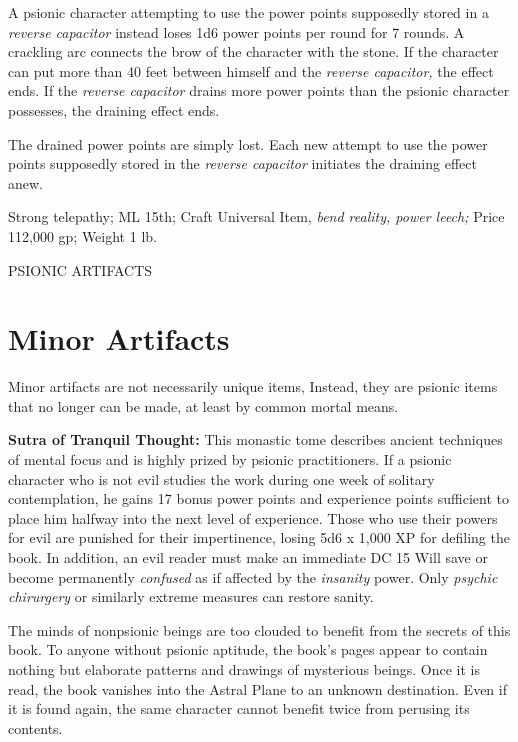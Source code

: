 \documentclass{article}
\begin{document}
A psionic character attempting to use the power points supposedly stored in a \textit{reverse 
capacitor }instead loses 1d6 power points per round for 7 rounds. A crackling arc 
connects the brow of the character with the stone. If the character can put more 
than 40 feet between himself and the \textit{reverse capacitor, }the effect ends. 
If the \textit{reverse capacitor }drains more power points than the psionic character 
possesses, the draining effect ends.

The drained power points are simply lost. Each new attempt to use the power points 
supposedly stored in the \textit{reverse capacitor }initiates the draining effect 
anew.

Strong telepathy; ML 15th; Craft Universal Item, \textit{bend reality, power leech; 
}Price 112,000 gp; Weight 1 lb.

\vspace{12pt}
PSIONIC ARTIFACTS

\section*{\textbf{Minor Artifacts}}

Minor artifacts are not necessarily unique items, Instead, they are psionic items 
that no longer can be made, at least by common mortal means.

\textbf{Sutra of Tranquil Thought:} This monastic tome describes ancient techniques 
of mental focus and is highly prized by psionic practitioners. If a psionic character 
who is not evil studies the work during one week of solitary contemplation, he 
gains 17 bonus power points and experience points sufficient to place him halfway 
into the next level of experience. Those who use their powers for evil are punished 
for their impertinence, losing 5d6 x 1,000 XP for defiling the book. In addition, 
an evil reader must make an immediate DC 15 Will save or become permanently \textit{confused 
}as if affected by the \textit{insanity }power. Only \textit{psychic chirurgery 
}or similarly extreme measures can restore sanity.

The minds of nonpsionic beings are too clouded to benefit from the secrets of this 
book. To anyone without psionic aptitude, the book's pages appear to contain nothing 
but elaborate patterns and drawings of mysterious beings. Once it is read, the 
book vanishes into the Astral Plane to an unknown destination. Even if it is found 
again, the same character cannot benefit twice from perusing its contents.
\end{document}

